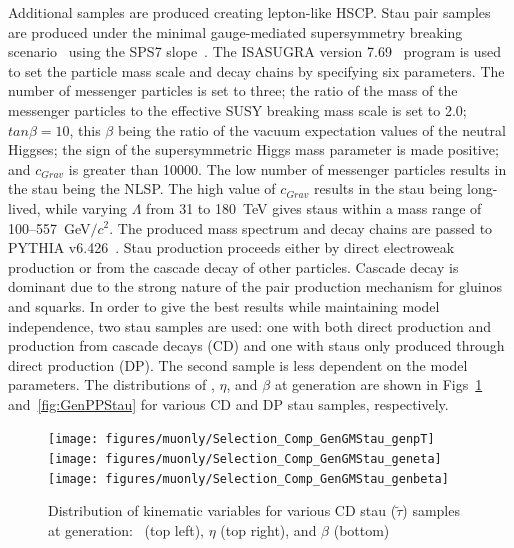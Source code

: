 
Additional samples are produced creating lepton-like HSCP. Stau pair samples
are produced under the minimal gauge-mediated supersymmetry breaking scenario~\cite{Giudice:1998bp} using the SPS7 slope~\cite{Allanach:2002nj}.
The ISASUGRA version 7.69~\cite{Paige:2003mg} program is used to set the particle mass scale and decay chains by specifying six parameters.
The number of messenger particles is set to three; the ratio of the mass of the messenger particles to the effective SUSY breaking mass scale is set to 2.0;
$tan \beta = 10$, this $\beta$ being the ratio of the vacuum expectation values of the neutral Higgses;
the sign of the supersymmetric Higgs mass parameter is made positive; and $c_{Grav}$ is greater than 10000.
The low number of messenger particles results in the stau being the NLSP.
The high value of $c_{Grav}$ results in the stau being long-lived, while varying $\Lambda$ from 31 to 180~TeV gives staus within a mass range of 100--557~GeV$/c^2$. 
The produced mass spectrum and decay chains are passed to PYTHIA v6.426~\cite{Sjostrand:2006za}. 
Stau production proceeds either by direct electroweak production or from the cascade
decay of other particles. Cascade decay is dominant due to the strong nature of the pair production mechanism for gluinos and squarks.
In order to give the best results while maintaining model independence, two stau samples are used: one with both direct production and production from cascade decays (CD)
and one with staus only produced through direct production (DP). The second sample is less dependent on the model parameters. The distributions
 of \pt, $\eta$, and $\beta$ at generation
are shown in Figs~\ref{fig:GenGMStau} and~\ref{fig:GenPPStau} for various CD and DP stau samples, respectively.

\begin{figure}
 \begin{center}
  \texttt{[image: figures/muonly/Selection\_Comp\_GenGMStau\_genpT]}
  \texttt{[image: figures/muonly/Selection\_Comp\_GenGMStau\_geneta]}
  \texttt{[image: figures/muonly/Selection\_Comp\_GenGMStau\_genbeta]}
 \end{center}
 \caption[Distribution of \pt, $\eta$, and $\beta$ for various CD stau samples at generation]
{Distribution of kinematic variables for various CD stau ($\tilde{\tau}$) samples at generation:
\pt\ (top left), $\eta$ (top right), and $\beta$ (bottom)
   \label{fig:GenGMStau}}
\end{figure}

